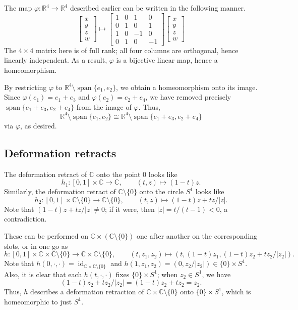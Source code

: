 \documentclass[11pt]{article}
\def\C{\mathbb{C}}
\def\R{\mathbb{R}}
\theoremstyle{definition}
\theoremstyle{remark}
\begin{document}
    The map $\varphi\colon \R^4 \to \R^4$ described earlier can be written in the
    following manner. \[
        \begin{bmatrix}x\\ y\\ z\\ w\end{bmatrix} \mapsto
        \begin{bmatrix}
            1 & 0 & 1 & 0 \\
            0 & 1 & 0 & 1 \\
            1 & 0 & -1 & 0 \\
            0 & 1 & 0 & -1
        \end{bmatrix}
        \begin{bmatrix}x\\ y\\ z\\ w\end{bmatrix}
    \] The $4\times 4$ matrix here is of full rank; all four columns are orthogonal,
    hence linearly independent. As a result, $\varphi$ is a bijective linear map,
    hence a homeomorphism.

    By restricting $\varphi$ to $\R^4\setminus\operatorname{span}\{e_1, e_2\}$, we
    obtain a homeomorphism onto its image. Since $\varphi(e_1) = e_1 + e_3$ and
    $\varphi(e_2) = e_2 + e_4$, we have removed precisely $\operatorname{span}\{e_1 +
    e_3, e_2 + e_4\}$ from the image of $\varphi$. Thus, \[
        \R^4\setminus\operatorname{span}\{e_1, e_2\} \cong
        \R^4\setminus\operatorname{span}\{e_1 + e_3, e_2 + e_4\}
    \] via $\varphi$, as desired.


    \subsection*{Deformation retracts}

    The deformation retract of $\C$ onto the point $0$ looks like \[
        h_1\colon [0, 1]\times \C \to \C, \qquad
        (t, z) \mapsto (1 - t)z.
    \] Similarly, the deformation retract of $\C\setminus\{0\}$ onto the circle
    $S^1$ looks like \[
        h_2\colon [0, 1]\times \C\setminus\{0\} \to \C\setminus\{0\}, \qquad
        (t, z) \mapsto (1 - t)z + tz/|z|.
    \] Note that $(1 - t)z + tz/|z| \neq 0$; if it were, then $|z| = t / (t - 1) <
    0$, a contradiction.

    These can be performed on $\C\times(\C\setminus\{0\})$ one after another on the
    corresponding slots, or in one go as \[
        h\colon [0, 1] \times \C \times \C\setminus\{0\} \to \C \times
        \C\setminus\{0\}, \qquad
        (t, z_1, z_2) \mapsto (t, (1 - t)z_1, (1 - t)z_2 + tz_2 / |z_2|).
    \] Note that $h(0, \cdot, \cdot) = \operatorname{id}_{\C\times\C\setminus\{0\}}$
    and $h(1, z_1, z_2) = (0, z_2 / |z_2|) \in \{0\} \times S^1$. Also, it is clear
    that each $h(t, \cdot, \cdot)$ fixes $\{0\}\times S^1$; when $z_2 \in S^1$, we
    have \[
        (1 - t)z_2 + tz_2 / |z_2| = (1 - t)z_2 + tz_2 = z_2.
    \] Thus, $h$ describes
    a deformation retraction of $\C\times \C\setminus\{0\}$ onto $\{0\} \times S^1$,
    which is homeomorphic to just $S^1$.
\end{document}
